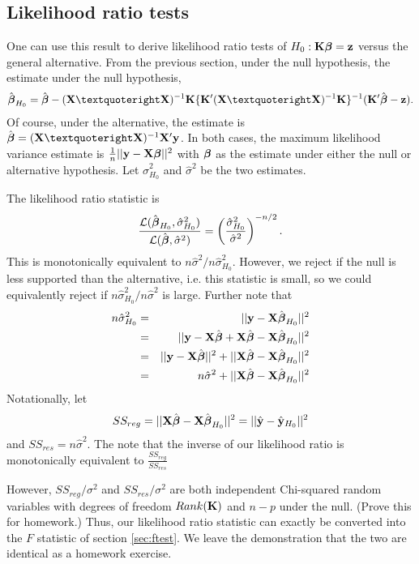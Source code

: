 \subsection{Likelihood ratio tests}
One can use this result to derive likelihood ratio tests of $H_0: \mathbf{K} \boldsymbol{\beta} = \mathbf{z}$ versus
the general alternative. From the previous section, under the null hypothesis, the
estimate under the null hypothesis, 
$$\hat \bbeta_{H_0} = \hat \bbeta -  \xtxinv \bK \{\bK' \xtxinv \bK\}^{-1} (\bK' \hat \bbeta - \bz).$$
Of course, under the alternative, the estimate is $\hat \bbeta = \xtxinv \bX' \by$. In both
cases, the maximum likelihood variance estimate is $\frac{1}{n}||\mathbf{y} - \mathbf{X} \boldsymbol{\beta}||^2$ with 
$\boldsymbol{\beta}$ as the estimate under either the null or alternative hypothesis. Let $\hat \sigma^2_{H_0}$
and $\hat \sigma^2$ be the two estimates.

The likelihood ratio statistic is
$$
\frac{{\cal L}(\hat {\boldsymbol{\beta}}_{H_0}, \hat \sigma^2_{H_0})}{{\cal L}(\hat {\boldsymbol{\beta}},\hat \sigma^2)}
= \left(\frac{\hat \sigma^2_{H_0}}{\hat \sigma^2} \right)^{-n/2}.
$$
This is monotonically equivalent to $n \hat \sigma^2 / n \hat \sigma^2_{H_0}$. However, we reject
if the null is less supported than the alternative, i.e. this statistic is small,
so we could equivalently reject if $n \hat \sigma^2_{H_0} / n \hat \sigma^2$ is large.
Further note
that 
\begin{eqnarray*}
n\hat \sigma^2_{H_0}
& = &||\mathbf{y} - \mathbf{X} \hat {\boldsymbol{\beta}}_{H_0}||^2 \\
& = & ||\mathbf{y} - \mathbf{X} \hat {\boldsymbol{\beta}} + \mathbf{X} \hat {\boldsymbol{\beta}} - \mathbf{X} \hat {\boldsymbol{\beta}}_{H_0}||^2 \\
& = & ||\mathbf{y} - \mathbf{X} \hat{\boldsymbol{\beta}}||^2 + ||\mathbf{X} \hat {\boldsymbol{\beta}} - \mathbf{X} \hat {\boldsymbol{\beta}}_{H_0}||^2 \\
& = & n \hat \sigma^2 + ||\mathbf{X} \hat {\boldsymbol{\beta}} - \mathbf{X} \hat {\boldsymbol{\beta}}_{H_0}||^2
\end{eqnarray*}
Notationally, let $$SS_{reg} = ||\mathbf{X} \hat {\boldsymbol{\beta}} - \mathbf{X} \hat {\boldsymbol{\beta}}_{H_0}||^2
= ||\hat {\mathbf{y}} - \hat {\mathbf{y}}_{H_0}||^2$$ and
$SS_{res} = n \hat \sigma^2$. 
The note that the inverse of our likelihood ratio is monotonically equivalent to 
$\frac{SS_{reg}}{SS_{res}}$

However, $SS_{reg} / \sigma^2$ and $SS_{res} / \sigma^2$ are both independent 
Chi-squared random variables with degrees of freedom $Rank(\mathbf{K})$ and $n - p$
under the null. (Prove this for homework.) Thus, our likelihood ratio statistic can
exactly be converted into the $F$ statistic of section \ref{sec:ftest}. We leave
the demonstration that the two are identical as a homework exercise.

